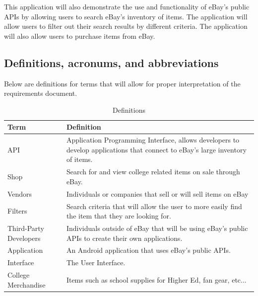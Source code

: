 \documentclass[journal,compsoc, 10pt, draftclsnofoot, onecolumn]{IEEEtran}
\begin{document}
This application will also demonstrate the use and functionality of eBay's 
public APIs by allowing users to search eBay's inventory of items. The 
application will allow users to filter out their search results by different 
criteria. The application will also allow users to purchase items from eBay. 

\subsection{Definitions, acronums, and abbreviations}

Below are definitions for terms that will allow for proper interpretation of the
 requirements document.

\begin{table}[]
\centering
\caption{Definitions}
\label{my-label}
\begin{tabularx}{\textwidth}{l|X}
\hline
\textbf{Term}               & \textbf{Definition}                                                                                                           \\ \hline
API                    	      & Application Programming Interface, allows developers to develop applications that connect to eBay's large inventory of items. \\ \hline
Shop                   	      & Search for and view college related items on sale through eBay.                                                               \\ \hline
Vendors               	      & Individuals or companies that sell or will sell items on eBay                                                                 \\ \hline
Filters                	      & Search criteria that will allow the user to more easily find the item that they are looking for.                              \\ \hline
Third-Party Developers & Individuals outside of eBay that will be using eBay's public APIs to create their own applications.                           \\ \hline
Application            	      & An Android application that uses eBay's public APIs.                                                                          \\ \hline
Interface              	      & The User Interface.                                                                                                           \\ \hline
College Merchandise     & Items such as school supplies for Higher Ed, fan gear, etc...                                                                 \\ \hline

\end{tabularx}
\end{table}
\end{document}
